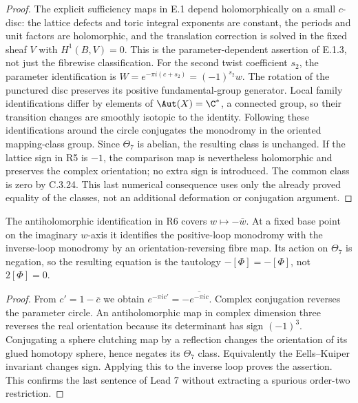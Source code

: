 \begin{proof}
The explicit sufficiency maps in E.1 depend holomorphically on a
small $c$-disc: the lattice defects and toric integral exponents are
constant, the periods and unit factors are holomorphic, and the
translation correction is solved in the fixed sheaf $V$ with
$H^1(B,V)=0$. This is the parameter-dependent assertion of E.1.3,
not just the fibrewise classification. For the second twist
coefficient $s_2$, the parameter identification is
$W=e^{-\pi i(c+s_2)}=(-1)^{s_2}w$.
The rotation of the punctured disc preserves its positive
fundamental-group generator. Local family identifications differ
by elements of $\Aut(X)=\C^*$, a connected group, so their
transition changes are smoothly isotopic to the identity. Following
these identifications around the circle conjugates the monodromy
in the oriented mapping-class group. Since $\Theta_7$ is abelian,
the resulting class is unchanged. If the lattice sign in R5 is
$-1$, the comparison map is nevertheless holomorphic and preserves
the complex orientation; no extra sign is introduced.
The common class is zero by C.3.24. This last numerical consequence
uses only the already proved equality of the classes, not an
additional deformation or conjugation argument.
\end{proof}

\begin{proposition}
The antiholomorphic identification in R6 covers
$w\mapsto-\bar w$. At a fixed base point on the imaginary
$w$-axis it identifies the positive-loop monodromy with the
inverse-loop monodromy by an orientation-reversing fibre map.
Its action on $\Theta_7$ is negation, so the resulting equation is
the tautology $-[\Phi]=-[\Phi]$, not $2[\Phi]=0$.
\end{proposition}

\begin{proof}
From $c'=1-\bar c$ we obtain
$e^{-\pi ic'}=-\overline{e^{-\pi ic}}$.
Complex conjugation reverses the parameter circle. An
antiholomorphic map in complex dimension three reverses the real
orientation because its determinant has sign $(-1)^3$.
Conjugating a sphere clutching map by a reflection changes the
orientation of its glued homotopy sphere, hence negates its
$\Theta_7$ class. Equivalently the Eells--Kuiper invariant changes
sign. Applying this to the inverse loop proves the assertion.
This confirms the last sentence of Lead 7 without extracting a
spurious order-two restriction.
\end{proof}


